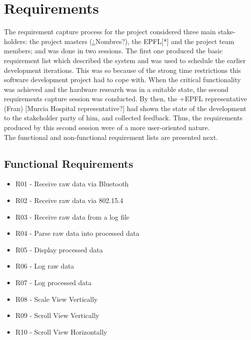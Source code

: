 	\section{Requirements}
		The requirement capture process for the project considered three main stake-holders: the project masters (¿Nombres?), the EPFL[*] and the project team members; and was done in two sessions. The first one produced the basic requirement list which described the system and was used to schedule the earlier development iterations. This was so because of the strong time restrictions this software development project had to cope with. 
		When the critical functionality was achieved and the hardware research was in a suitable state, the second requirements capture session was conducted. By then, the +EPFL representative (Fran) [Murcia Hospital representative?] had shown the state of the development to the stakeholder party of him, and collected feedback. Thus, the requirements produced by this second session were of a more user-oriented nature.\\

		
		The functional and non-functional requirement lists are presented next.

		\subsection{Functional Requirements}
		\begin{itemize}
		\item R01 - Receive raw data via Bluetooth
		\item R02 - Receive raw data via 802.15.4
		\item R03 - Receive raw data from a log file
		\item R04 - Parse raw data into processed data
		\item R05 - Display processed data
		\item R06 - Log raw data
		\item R07 - Log processed data	%
		\item R08 - Scale View Vertically
		\item R09 - Scroll View Vertically
		\item R10 - Scroll View Horizontally
		\end{itemize}

